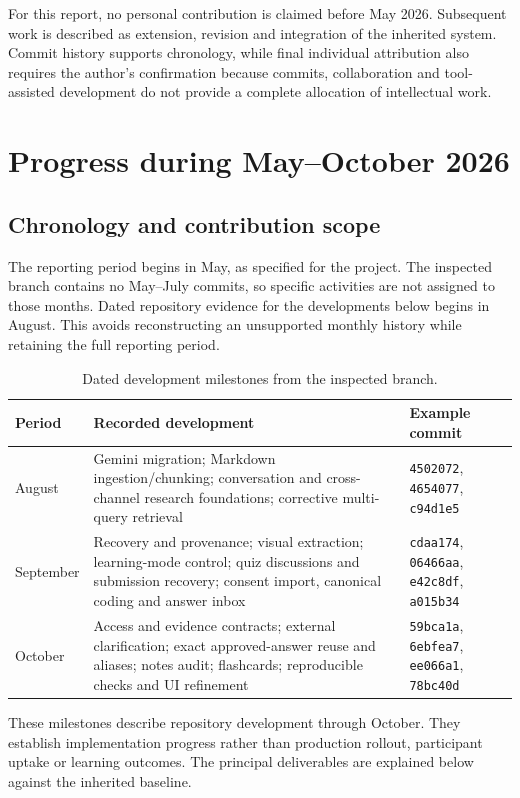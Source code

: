\documentclass[11pt,a4paper]{article}
\begin{document}
For this report, no personal contribution is claimed before May 2026. Subsequent work is described as extension, revision and integration of the inherited system. Commit history supports chronology, while final individual attribution also requires the author's confirmation because commits, collaboration and tool-assisted development do not provide a complete allocation of intellectual work.

\section{Progress during May--October 2026}
\subsection{Chronology and contribution scope}
The reporting period begins in May, as specified for the project. The inspected branch contains no May--July commits, so specific activities are not assigned to those months. Dated repository evidence for the developments below begins in August. This avoids reconstructing an unsupported monthly history while retaining the full reporting period.

\begin{table}[htbp]
\centering\small
\caption{Dated development milestones from the inspected branch.}
\begin{tabularx}{\textwidth}{@{}P{0.20\textwidth}YP{0.20\textwidth}@{}}
\toprule
Period & Recorded development & Example commit\\
\midrule
August & Gemini migration; Markdown ingestion/chunking; conversation and cross-channel research foundations; corrective multi-query retrieval & \texttt{4502072}, \texttt{4654077}, \texttt{c94d1e5}\\
September & Recovery and provenance; visual extraction; learning-mode control; quiz discussions and submission recovery; consent import, canonical coding and answer inbox & \texttt{cdaa174}, \texttt{06466aa}, \texttt{e42c8df}, \texttt{a015b34}\\
October & Access and evidence contracts; external clarification; exact approved-answer reuse and aliases; notes audit; flashcards; reproducible checks and UI refinement & \texttt{59bca1a}, \texttt{6ebfea7}, \texttt{ee066a1}, \texttt{78bc40d}\\
\bottomrule
\end{tabularx}
\end{table}

These milestones describe repository development through October. They establish implementation progress rather than production rollout, participant uptake or learning outcomes. The principal deliverables are explained below against the inherited baseline.
\end{document}
